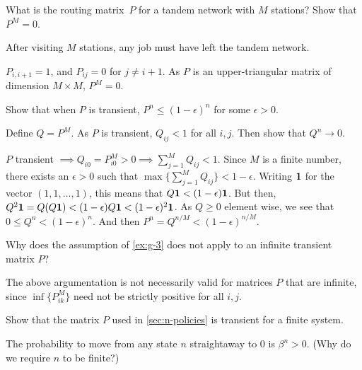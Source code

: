 \begin{exercise}
What is the  routing matrix~$P$ for a tandem network with $M$ stations? Show that $P^M = 0$.
\begin{hint}
After visiting $M$ stations, any job must have left the tandem network.
\end{hint}
\begin{solution}
$P_{i, i+1} = 1$, and $P_{i j} = 0$ for $j\neq i+1$. As $P$ is an upper-triangular matrix of dimension $M\times M$, $P^M =0$.
\end{solution}
\end{exercise}



\begin{exercise}\label{ex:g-3}
Show that when $P$ is transient, $P^n \leq (1-\epsilon)^n$ for some $\epsilon > 0$.
\begin{hint}
  Define $Q= P^M$. As $P$ is transient, $Q_{ij} < 1$ for all $i, j$. Then show that $Q^n \to 0$.
\end{hint}
\begin{solution}
  $P$ transient $\implies Q_{i0} = P_{i0}^M > 0 \implies \sum_{j=1}^M Q_{ij} < 1$.
  Since $M$ is a finite number, there exists an $\epsilon>0$ such that $\max\{\sum_{j=1}^M Q_{ij}\} < 1-\epsilon$.
  Writing $\bf 1$ for the vector $(1,1,\ldots, 1)$, this  means that $Q{\bf 1} < (1-\epsilon) {\bf 1}$.
  But then, $ Q^{2} {\bf 1} = Q(Q{\bf 1}) < (1-\epsilon) Q{\bf 1} < (1-\epsilon)^2 {\bf 1}$.
As $Q\geq 0$ element wise, we see that $0\leq Q^n < (1-\epsilon)^n$. And then $P^n = Q^{n/M} < (1-\epsilon)^{n/M}$.
\end{solution}
\end{exercise}




\begin{exercise}
  Why does the assumption of \cref{ex:g-3} does not apply to an infinite transient matrix $P$?
\begin{solution}
  The above argumentation is not necessarily valid for matrices $P$ that are infinite, since $\inf\{P^{M}_{ik}\}$ need not be strictly positive for all $i, j$.
\end{solution}
\end{exercise}

\begin{exercise}
Show that the matrix $P$  used in \cref{sec:n-policies} is transient for a finite system.
\begin{solution}
The probability to move from any state $n$ straightaway to $0$ is $\beta^n >0$. (Why do we require $n$ to be finite?)
\end{solution}
\end{exercise}



